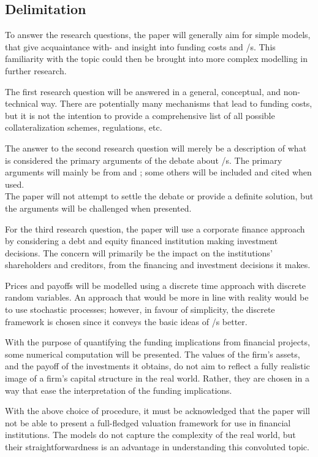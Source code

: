 \documentclass[main.tex]{subfiles}
\begin{document}
    \subsection{Delimitation}

    To answer the research questions, the paper will generally aim for simple models,
    that give acquaintance with- and insight into funding costs and \FVA/s.
    This familiarity with the topic could then be brought into more complex modelling
    in further research.

    The first research question will be answered in a general, conceptual, and 
    non-tech\-nical %
    way.
    There are potentially many mechanisms that lead to funding costs,
    but it is not the intention to provide a comprehensive list 
    of all possible collateralization schemes, regulations, etc.

    The answer to the second research question will merely be a description 
    of what is considered the primary arguments of the debate about \FVA/s.
    The primary arguments will mainly be from 
    \textcite{HullWhite2012FVA} and \textcite{Castagna2012FVA};
    some others will be included and cited when used.
    \\
    The paper will not attempt to settle the debate or provide a definite solution,
    but the arguments will be challenged when presented.

    For the third research question, the paper will use a corporate finance approach
    by considering a debt and equity financed institution making investment decisions.
    The concern will primarily be the impact on the institutions' shareholders and creditors,
    from the financing and investment decisions it makes.

    Prices and payoffs will be modelled using a discrete time approach 
    with discrete random variables.
    An approach that would be more in line with reality would be to use stochastic processes;
    however, in favour of simplicity, the discrete framework is chosen 
    since it conveys the basic ideas of \FVA/s better.

    With the purpose of quantifying the funding implications from financial projects,
    some numerical computation will be presented.
    The values of the firm's assets, and the payoff of the investments it obtains,
    do not aim to reflect a fully realistic image of a firm's capital structure in the real world.
    Rather, they are chosen in a way that ease the interpretation of the funding implications.

    With the above choice of procedure, it must be acknowledged that the paper will not be able to
    present a full-fledged valuation framework for use in financial institutions.
    The models do not capture the complexity of the real world,
    but their straightforwardness is an advantage in understanding this convoluted topic.
\end{document}

